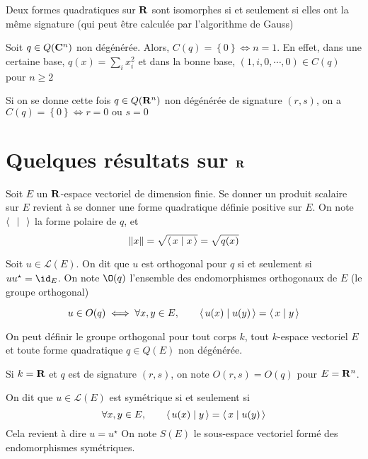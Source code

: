 \begin{rem}[Résumé]
    Deux formes quadratiques sur $ \mathbf R$ sont isomorphes si et seulement si elles ont la même signature (qui peut être calculée par l'algorithme de Gauss)
\end{rem}

\begin{rem}
    Soit $q \in Q(\mathbf C^n)$ non dégénérée. Alors, $C(q)= \left\{ 0 \right\} \iff  n=1$. En effet, dans une certaine base, $q(x)= \sum_i x_i^2 $ et dans la bonne base, $(1, i, 0, \cdots , 0) \in  C(q)$ pour $n\geq 2$

    Si on se donne cette fois $q \in  Q(\mathbf R^n)$ non dégénérée de signature $(r, s)$, on a $C(q)= \left\{ 0 \right\}  \iff  r=0 \text{ ou }s=0$
\end{rem}

\section{Quelques résultats sur \texorpdfstring{$ \mathbf R$}{R}}

Soit $E$ un  $ \mathbf R$-espace vectoriel de dimension finie. Se donner un produit scalaire sur $E$ revient à se donner une forme quadratique définie positive sur  $E$. On note $\scalar{\;}{\;} $ la forme polaire de $q$, et  \[
    \|x\|=\sqrt{\scalar{x}{x} }=\sqrt{q(x)}
\] 

\begin{dfn}
    Soit $u \in  \mathcal  L(E)$. On dit que $u$ est orthogonal pour  $q$  si et seulement si $uu^\star=\id_E$. On note  $\O(q)$ l'ensemble des endomorphismes orthogonaux de  $E$ (le groupe orthogonal)
\end{dfn}

\begin{rem}
\[
    u \in  O(q) \iff  \forall  x, y \in E, \qquad  \scalar{u(x)}{u(y)} =\scalar{x}{y} 
\] 
\end{rem}

\begin{rem}
    On peut définir le groupe orthogonal pour tout corps $k$, tout  $k$-espace vectoriel  $E$ et toute forme quadratique  $q \in  Q(E)$ non dégénérée.

    Si $k=\mathbf R$ et $q$ est de signature  $(r, s)$, on note  $O(r, s)=O(q)$ pour  $E=\mathbf R^n$.
\end{rem}

\begin{dfn}
    On dit que $u \in  \mathcal  L(E)$ est symétrique si et seulement si \[
        \forall  x, y \in  E, \qquad  \scalar{u(x)}{y} = \scalar{x}{u(y)} 
    \] 
    Cela revient à dire $u=u^\star$
    On note  $S(E)$ le sous-espace vectoriel formé  des endomorphismes symétriques.
\end{dfn}

